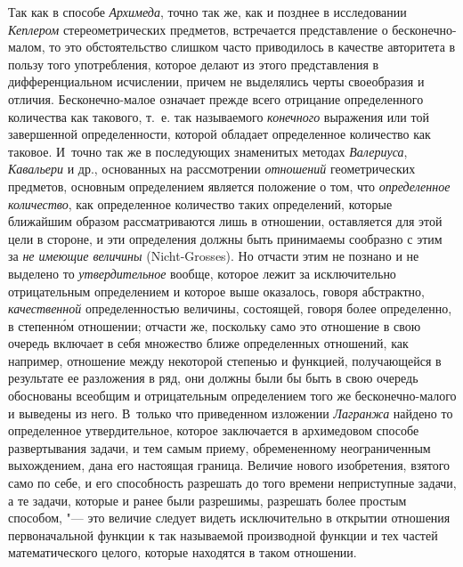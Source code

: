 Так как в способе {\em Архимеда}, точно так же, как и
позднее в исследовании {\em Кеплером} стереометрических
предметов, встречается представление о бесконечно-малом, то это
обстоятельство слишком часто приводилось в качестве авторитета в пользу
того употребления, которое делают из этого представления в дифференциальном
исчислении, причем не выделялись черты своеобразия и отличия.
Бесконечно-малое означает прежде всего отрицание определенного количества
как такового, т.~е. так называемого {\em конечного}
выражения или той завершенной определенности, которой обладает определенное
количество как таковое. И~точно так же в последующих знаменитых методах
{\em Валериуса}, {\em Кавальери} и
др., основанных на рассмотрении {\em отношений}
геометрических предметов, основным определением является положение о том,
что {\em определенное количество}, как определенное
количество таких определений, которые ближайшим образом рассматриваются
лишь в отношении, оставляется для этой цели в стороне, и эти определения
должны быть принимаемы сообразно с этим за {\em не
имеющие величины} (Nicht-Grosses). Но отчасти этим не познано и не выделено
то {\em утвердительное} вообще, которое лежит за
исключительно отрицательным определением и которое выше оказалось, говоря
абстрактно, {\em качественной} определенностью
величины, состоящей, говоря более определенно, в степенн\'{о}м отношении;
отчасти же, поскольку само это отношение в свою очередь включает в себя
множество ближе определенных отношений, как например, отношение между
некоторой степенью и функцией, получающейся в результате ее разложения в
ряд, они должны были бы быть в свою очередь обоснованы всеобщим и
отрицательным определением того же бесконечно-малого и выведены из него.
В~только что приведенном изложении {\em Лагранжа} найдено
то определенное утвердительное, которое заключается в архимедовом способе
развертывания задачи, и тем самым приему, обремененному неограниченным
выхождением, дана его настоящая граница. Величие нового изобретения,
взятого само по себе, и его способность разрешать до того времени
неприступные задачи, а те задачи, которые и ранее были разрешимы, разрешать
более простым способом, "--- это величие следует видеть исключительно в
открытии отношения первоначальной функции к так называемой производной функции
и тех частей математического целого, которые находятся в таком отношении.

